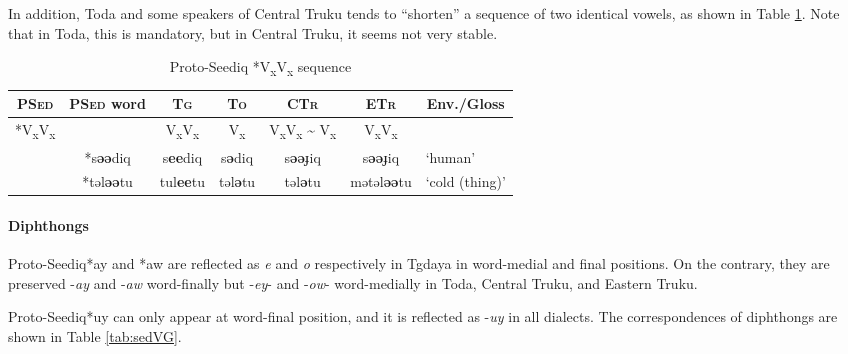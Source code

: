 \documentclass[12pt]{article}
\newcommand{\psed}{\textsc{PSed}\xspace}
\newcommand{\psedf}{Proto-Seediq\xspace}
\newcommand{\stg}{\textsc{Tg}\xspace}
\newcommand{\stgf}{Tgdaya\xspace}
\newcommand{\sto}{\textsc{To}\xspace}
\newcommand{\stof}{Toda\xspace}
\newcommand{\sctr}{\textsc{CTr}\xspace}
\newcommand{\sctrf}{Central Truku\xspace}
\newcommand{\setr}{\textsc{ETr}\xspace}
\newcommand{\setrf}{Eastern Truku\xspace}
\begin{document}
In addition, \stof and some speakers of \sctrf tends to ``shorten'' a sequence of two identical vowels, as shown in Table \ref{tab:VxVx}. Note that in \stof, this is mandatory, but in \sctrf, it seems not very stable. 

\begin{table}[!htbp]
\centering
\caption{Proto-Seediq *V\textsubscript{x}V\textsubscript{x} sequence}
\label{tab:VxVx}
\begin{tabular}{c|c|cccc|l}
\textbf{\psed} & \textbf{\psed word}      & \textbf{\stg} & \textbf{\sto} & \textbf{\sctr} & \textbf{\setr} & \multicolumn{1}{c}{\textbf{Env./Gloss}} \\ \hline
\multirow{3}{*}{*V\textsubscript{x}V\textsubscript{x}} & & V\textsubscript{x}V\textsubscript{x} & V\textsubscript{x} & V\textsubscript{x}V\textsubscript{x} \~{ } V\textsubscript{x} & V\textsubscript{x}V\textsubscript{x} & \\ \cline{2-7}
 & *s\textbf{əə}diq & s\textbf{ee}diq & s\textbf{ə}diq & s\textbf{əə}ɟiq & s\textbf{əə}ɟiq & `human'      \\ 
 & *təl\textbf{əə}tu & tul\textbf{ee}tu & təl\textbf{ə}tu & təl\textbf{ə}tu & mətəl\textbf{əə}tu & `cold (thing)' \\ \hline

\end{tabular}
\end{table}

\paragraph{Diphthongs}

\psedf *ay and *aw are reflected as \textit{e} and \textit{o} respectively in \stgf in word-medial and final positions. On the contrary, they are preserved -\textit{ay} and -\textit{aw} word-finally but -\textit{ey}- and -\textit{ow}- word-medially in \stof, \sctrf, and \setrf. 

\psedf *uy can only appear at word-final position, and it is reflected as -\textit{uy} in all dialects. The correspondences of diphthongs are shown in Table \ref{tab:sedVG}.
\end{document}
